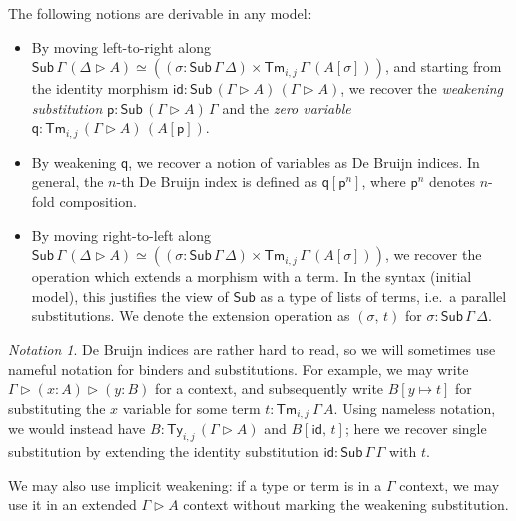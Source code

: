 \documentclass[acmsmall]{acmart}
\newcommand{\msf}[1]{\mathsf{#1}}
\newcommand{\ext}{\triangleright}
\newcommand{\Sub}{\msf{Sub}}
\newcommand{\Ty}{\msf{Ty}}
\newcommand{\Tm}{\msf{Tm}}
\newcommand{\p}{\mathsf{p}}
\newcommand{\q}{\mathsf{q}}
\newcommand{\id}{\msf{id}}
\theoremstyle{remark}
\newtheorem{notation}{Notation}
\begin{document}
The following notions are derivable in any model:
\begin{itemize}
\item
  By moving left-to-right along $\Sub\,\Gamma\,(\Delta\ext A) \simeq ((\sigma :
  \Sub\,\Gamma\,\Delta) \times \Tm_{i,j}\,\Gamma\,(A[\sigma]))$,
  and starting from the identity morphism $\id : \Sub\,(\Gamma\ext A)\,(\Gamma\ext A)$, we recover
  the \emph{weakening substitution} $\p : \Sub\,(\Gamma\ext A)\,\Gamma$ and the \emph{zero variable}
  $\q : \Tm_{i,j}\,(\Gamma\ext A)\,(A[\p])$.
\item
  By weakening $\q$, we recover a notion of variables as De Bruijn
  indices. In general, the $n$-th De Bruijn index is defined as $\q[\p^{n}]$,
  where $\p^{n}$ denotes $n$-fold composition.
\item
  By moving right-to-left along $\Sub\,\Gamma\,(\Delta\ext A) \simeq ((\sigma :
  \Sub\,\Gamma\,\Delta) \times \Tm_{i,j}\,\Gamma\,(A[\sigma]))$, we recover the
  operation which extends a morphism with a term. In the syntax (initial model),
  this justifies the view of $\Sub$ as a type of lists of terms, i.e.\ a
  parallel substitutions. We denote the extension operation as $(\sigma,\,t)$
  for $\sigma : \Sub\,\Gamma\,\Delta$.
\end{itemize}

\begin{notation}
De Bruijn indices are rather hard to read, so we will sometimes use nameful notation
for binders and substitutions. For example, we may write $\Gamma \ext (x : A)
\ext (y : B)$ for a context, and subsequently write $B[y \mapsto t]$ for
substituting the $x$ variable for some term $t : \Tm_{i,j}\,\Gamma\,A$. Using
nameless notation, we would instead have $B : \Ty_{i,j}\,(\Gamma \ext A)$ and
$B[\id,\,t]$; here we recover single substitution by extending the identity
substitution $\id : \Sub\,\Gamma\,\Gamma$ with $t$.

We may also use implicit weakening: if a type or term is in a $\Gamma$ context,
we may use it in an extended $\Gamma \ext A$ context without marking the
weakening substitution.
\end{notation}
\end{document}
